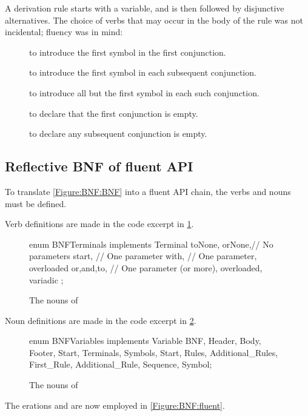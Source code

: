 A derivation rule starts with a variable, and is then followed by disjunctive alternatives.
The choice of verbs that may occur in the body of the rule was not incidental; 
  fluency was in mind:
\begin{description}
  \item[] to introduce the first symbol in the first conjunction.
  \item[] to introduce the first symbol in each subsequent conjunction.
  \item[] to introduce all but the first symbol in each such conjunction.
  \item[] to declare that the first conjunction is empty.
  \item[] to declare any subsequent conjunction is empty.
\end{description}

\subsection{Reflective BNF of fluent API}

To translate \cref{Figure:BNF:BNF} into a fluent
API chain, the verbs and nouns must be defined.

Verb definitions are made in the code excerpt in
\cref{Figure:Verbs}.

\begin{figure}[H]
  \begin{JAVA}[style=code]
enum BNFTerminals implements Terminal {
  toNone, orNone,// No parameters
  start,         // One parameter 
  with,          // One parameter, overloaded 
  or,and,to,     // One parameter (or more), overloaded, variadic 
  ;
} \end{JAVA}
  \caption{The nouns of \SELF}
  \label{Figure:Verbs}
\end{figure}

Noun definitions are made in the code excerpt in \cref{Figure:Nouns}.

\begin{figure}[H]
  \begin{JAVA}[style=code]
enum BNFVariables implements Variable {
  BNF, Header, Body, Footer,
  Start, Terminals, Symbols,
  Start, Rules, Additional_Rules,
  First_Rule, Additional_Rule,
  Sequence, Symbol;
}\end{JAVA}
  \caption{The nouns of \SELF}
  \label{Figure:Nouns}
\end{figure}

The
erations  and
  are now employed in \cref{Figure:BNF:fluent}.


